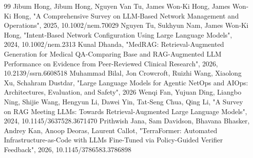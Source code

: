 \documentclass[conference]{IEEEtran}
\begin{document}
\begin{thebibliography}{99}
 Jibum Hong, Jibum Hong, Nguyen Van Tu, James Won‐Ki Hong, James Won‐Ki Hong, "A Comprehensive Survey on LLM‐Based Network Management and Operations", 2025, 10.1002/nem.70029
 Nguyen Tu, Sukhyun Nam, James Won‐Ki Hong, "Intent‐Based Network Configuration Using Large Language Models", 2024, 10.1002/nem.2313
 Kunal Dhanda, "MedRAG: Retrieval-Augmented Generation for Medical QA-Comparing Base and RAG-Augmented LLM Performance on Evidence from Peer-Reviewed Clinical Research", 2026, 10.2139/ssrn.6608518
 Muhammad Bilal, Jon Crowcroft, Ruizhi Wang, Xiaolong Xu, Schahram Dustdar, "Large Language Models for Agentic NetOps and AIOps: Architectures, Evaluation, and Safety", 2026
 Wenqi Fan, Yujuan Ding, Liangbo Ning, Shijie Wang, Hengyun Li, Dawei Yin, Tat‐Seng Chua, Qing Li, "A Survey on RAG Meeting LLMs: Towards Retrieval-Augmented Large Language Models", 2024, 10.1145/3637528.3671470
 Prithwish Jana, Sam Davidson, Bhavana Bhasker, Andrey Kan, Anoop Deoras, Laurent Callot, "TerraFormer: Automated Infrastructure-as-Code with LLMs Fine-Tuned via Policy-Guided Verifier Feedback", 2026, 10.1145/3786583.3786898
\end{thebibliography}
\end{document}
